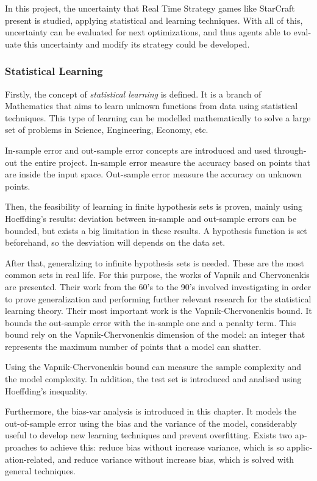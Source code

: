 \begin{otherlanguage}{british}

In this project, the uncertainty that Real Time Strategy games like StarCraft
present is studied, applying statistical and learning techniques.
With all of this, uncertainty can be evaluated for next optimizations,
and thus agents able to evaluate this uncertainty and modify its strategy could
be developed.

\subsubsection*{Statistical Learning}

Firstly, the concept of \emph{statistical learning} is defined. It is a branch
of Mathematics that aims to learn unknown functions from data using statistical
techniques. This type of learning can be modelled mathematically to solve a
large set of problems in Science, Engineering, Economy, etc.

In-sample error and out-sample error concepts are introduced and used
throughout the entire project. In-sample error measure the accuracy based on
points that are inside the input space. Out-sample error measure the accuracy
on unknown points.

Then, the feasibility of learning in finite hypothesis sets is proven, mainly
using Hoeffding’s results: deviation between in-sample and out-sample errors
can be bounded, but exists a big limitation in these results. A hypothesis
function is set beforehand, so the desviation will depends on the data set.

After that, generalizing to infinite hypothesis sets is needed. These are the
most common sets in real life. For this purpose, the works of Vapnik and
Chervonenkis are presented. Their work from the 60’s to the 90’s involved
investigating in order to prove generalization and performing further relevant
research for the statistical learning theory. Their most important work is the
Vapnik-Chervonenkis bound. It bounds the out-sample error with the in-sample
one and a penalty term. This bound rely on the Vapnik-Chervonenkis dimension
of the model: an integer that represents the maximum number of points that a
model can shatter.

Using the Vapnik-Chervonenkis bound can measure the sample complexity and the
model complexity. In addition, the test set is introduced and analised using
Hoeffding's inequality.

Furthermore, the bias-var analysis is introduced in this chapter.
It models the out-of-sample error using the bias and the variance of the model,
considerably useful to develop new learning techniques and prevent overfitting.
Exists two approaches to achieve this: reduce bias without increase variance,
which is so application-related, and reduce variance without increase bias,
which is solved with general techniques.


\end{otherlanguage}
